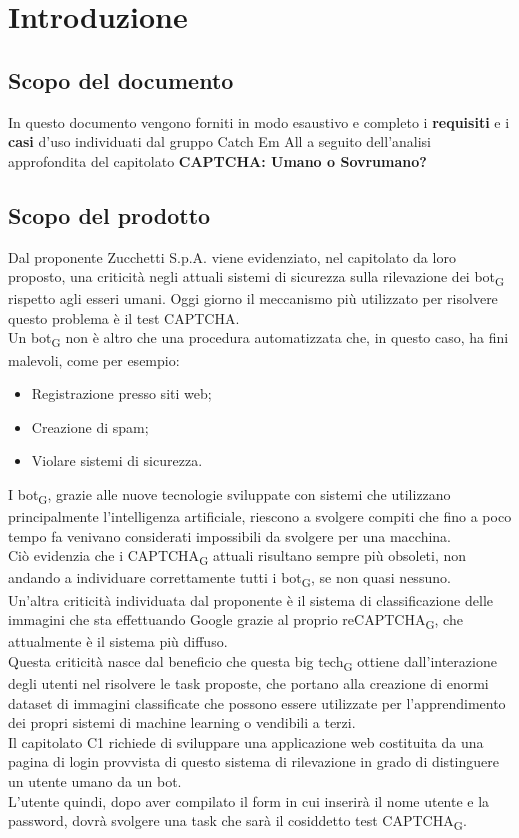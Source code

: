 \section{Introduzione}

\subsection{Scopo del documento}
In questo documento vengono forniti in modo esaustivo e completo i \textbf{requisiti} e i \textbf{casi} d'uso individuati dal gruppo Catch Em All a seguito dell'analisi approfondita del capitolato \textbf{CAPTCHA: Umano o Sovrumano?}

\subsection{Scopo del prodotto}
Dal proponente Zucchetti S.p.A. viene evidenziato, nel capitolato da loro proposto, una criticità negli attuali sistemi di sicurezza sulla rilevazione dei bot\textsubscript{G} rispetto agli esseri umani. Oggi giorno il meccanismo più utilizzato per risolvere questo problema è il test CAPTCHA.\\
Un bot\textsubscript{G} non è altro che una procedura automatizzata che, in questo caso, ha fini malevoli, come per esempio:
\begin{itemize}
 	\item Registrazione presso siti web;
	\item Creazione di spam;
	\item Violare sistemi di sicurezza.
\end{itemize}
I bot\textsubscript{G}, grazie alle nuove tecnologie sviluppate con sistemi che utilizzano principalmente l'intelligenza artificiale, riescono a svolgere compiti che fino a poco tempo fa venivano considerati impossibili da svolgere per una macchina.\\
Ciò evidenzia che i CAPTCHA\textsubscript{G} attuali risultano sempre più obsoleti, non andando a individuare correttamente tutti i bot\textsubscript{G}, se non quasi nessuno.\\
Un'altra criticità individuata dal proponente è il sistema di classificazione delle immagini che sta effettuando Google grazie al proprio reCAPTCHA\textsubscript{G}, che attualmente è il sistema più diffuso.\\
Questa criticità nasce dal beneficio che questa big tech\textsubscript{G} ottiene dall'interazione degli utenti nel risolvere le task proposte, che portano alla creazione di enormi dataset di immagini classificate che possono essere utilizzate per l'apprendimento dei propri sistemi di machine learning o vendibili a terzi.\\
Il capitolato C1 richiede di sviluppare una applicazione web costituita da una pagina di login provvista di questo sistema di rilevazione in grado di distinguere un utente umano da un bot.\\
L'utente quindi, dopo aver compilato il form in cui inserirà il nome utente e la password, dovrà svolgere una task che sarà il cosiddetto test CAPTCHA\textsubscript{G}.



